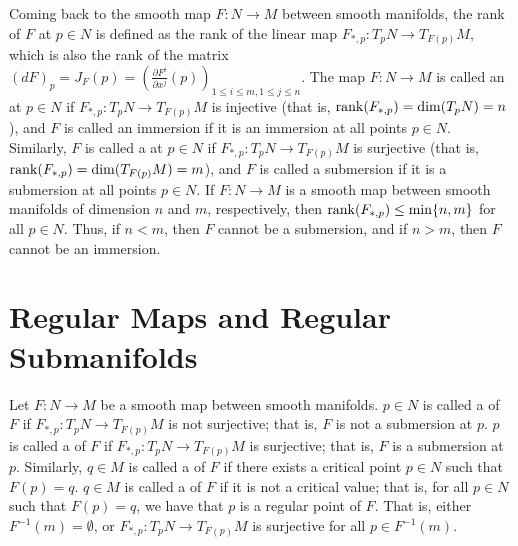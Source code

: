 Coming back to the smooth map $F:N \to M$ between smooth manifolds, the rank of $F$ at $p \in N$ is defined as the rank of the linear map $F_{\ast,p}:T_{p}N \to T_{F(p)}M$, which is also the rank of the matrix $(dF)_{p} = J_{F}(p) = \left( \frac{\partial F^{i}}{\partial x^{j}}(p) \right)_{1 \leq i \leq m, 1 \leq j \leq n}$. The map $F:N \to M$ is called an  at $p \in N$ if $F_{\ast,p}:T_{p}N \to T_{F(p)}M$ is injective (that is, $\operatorname{rank}(F_{\ast,p}) = \dim(T_{p}N) = n$), and $F$ is called an immersion if it is an immersion at all points $p \in N$. Similarly, $F$ is called a  at $p \in N$ if $F_{\ast,p}:T_{p}N \to T_{F(p)}M$ is surjective (that is, $\operatorname{rank}(F_{\ast,p}) = \dim(T_{F(p)}M) = m$), and $F$ is called a submersion if it is a submersion at all points $p \in N$. If $F:N \to M$ is a smooth map between smooth manifolds of dimension $n$ and $m$, respectively, then $\operatorname{rank}(F_{\ast,p}) \leq \min\{n,m\}$ for all $p \in N$. Thus, if $n < m$, then $F$ cannot be a submersion, and if $n > m$, then $F$ cannot be an immersion.

\section{Regular Maps and Regular Submanifolds}

\begin{definition}
    Let $F:N \to M$ be a smooth map between smooth manifolds. $p \in N$ is called a  of $F$ if $F_{\ast,p}:T_{p}N \to T_{F(p)}M$ is not surjective; that is, $F$ is not a submersion at $p$. $p$ is called a  of $F$ if $F_{\ast,p}:T_{p}N \to T_{F(p)}M$ is surjective; that is, $F$ is a submersion at $p$. Similarly, $q \in M$ is called a  of $F$ if there exists a critical point $p \in N$ such that $F(p) = q$. $q \in M$ is called a  of $F$ if it is not a critical value; that is, for all $p \in N$ such that $F(p) = q$, we have that $p$ is a regular point of $F$. That is, either $F^{-1}(m) = \emptyset$, or $F_{\ast,p}:T_{p}N \to T_{F(p)}M$ is surjective for all $p \in F^{-1}(m)$.
\end{definition}

